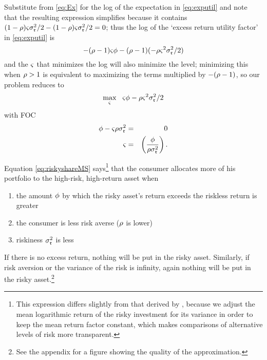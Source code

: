 Substitute from \eqref{eq:Ex} for the log of the expectation in
\eqref{eq:exputil} and note that the resulting expression simplifies because it contains
${(1-\rho){\varsigma}\sigma_{\mathfrak{r}}^{2}/2-(1-\rho){\varsigma}\sigma_{\mathfrak{r}}^{2}/2}=0$;
thus the log of the `excess return utility factor' in \eqref{eq:exputil} is
\begin{equation}
  -(\rho-1){\varsigma} \phi - (\rho-1)(- \rho {\varsigma}^{2}\sigma_{\mathfrak{r}}^{2}/2)
\end{equation}
and the ${\varsigma}$ that minimizes the log will also
minimize the level; minimizing this when $\rho>1$ is equivalent to
maximizing the terms multiplied by $-(\rho-1)$, so our problem
reduces to
\[
\max_{{\varsigma}}~~ {\varsigma} \phi -\rho{\varsigma}^{2}\sigma_{\mathfrak{r}}^{2}/2
\]
with FOC
\begin{eqnarray}
         \phi-{\varsigma}\rho\sigma_{\mathfrak{r}}^{2}  & = & 0  \notag \\
{\varsigma} & = & \left(\frac{\phi}{\rho \sigma_{\mathfrak{r}}^{2}}\right)
. \label{eq:riskyshareMS}
\end{eqnarray}

Equation \eqref{eq:riskyshareMS} says\footnote{This expression differs
  slightly from that derived by \cite{cvAppendix}, because we adjust
  the mean logarithmic return of the risky investment for its variance
  in order to keep the mean return factor constant, which makes
  comparisons of alternative levels of risk more transparent.}  that the
consumer allocates more of his portfolio to the high-risk, high-return
asset when
\begin{enumerate}
\item the amount $\phi$ by which the risky
asset's return exceeds the riskless return is greater
\item the consumer is less risk averse ($\rho$ is lower)
\item riskiness $\sigma^{2}_{\mathfrak{r}}$ is less
\end{enumerate}
If there is no excess return, nothing will be put in the risky asset.  Similarly, if
risk aversion or the variance of the risk is infinity, again nothing
will be put in the risky asset.\footnote{See the appendix for a figure
  showing the quality of the approximation.}

